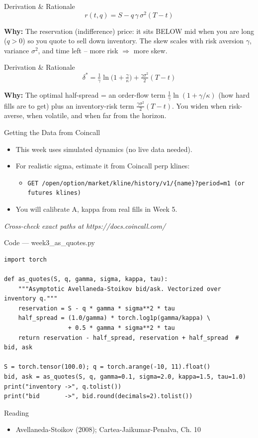 \documentclass[aspectratio=169,10pt]{beamer}
\begin{document}
\begin{frame}{Derivation \& Rationale}
\[r(t,q) = S - q\,\gamma\,\sigma^2 (T-t)\]

\small\textbf{\color{ncsured}Why:} The reservation (indifference) price: it sits BELOW mid when you are long ($q>0$) so you quote to sell down inventory. The skew scales with risk aversion $\gamma$, variance $\sigma^2$, and time left -- more risk $\Rightarrow$ more skew.
\end{frame}

\begin{frame}{Derivation \& Rationale}
\[\delta^* = \tfrac{1}{\gamma}\ln\!\big(1+\tfrac{\gamma}{\kappa}\big) + \tfrac{\gamma\sigma^2}{2}(T-t)\]

\small\textbf{\color{ncsured}Why:} The optimal half-spread = an order-flow term $\tfrac1\gamma\ln(1+\gamma/\kappa)$ (how hard fills are to get) plus an inventory-risk term $\tfrac{\gamma\sigma^2}{2}(T-t)$. You widen when risk-averse, when volatile, and when far from the horizon.
\end{frame}

\begin{frame}{Getting the Data from Coincall}
\begin{itemize}
  \item This week uses simulated dynamics (no live data needed).
  \item For realistic sigma, estimate it from Coincall perp klines:
  \begin{itemize}\item \texttt{\small GET /open/option/market/kline/history/v1/\{name\}?period=m1  (or futures klines)}\end{itemize}
  \item You will calibrate A, kappa from real fills in Week 5.
\end{itemize}
\vspace{2pt}\tiny\textit{Cross-check exact paths at https://docs.coincall.com/}
\end{frame}

\begin{frame}[fragile]{Code --- week3\_as\_quotes.py}
\begin{lstlisting}
import torch

def as_quotes(S, q, gamma, sigma, kappa, tau):
    """Asymptotic Avellaneda-Stoikov bid/ask. Vectorized over inventory q."""
    reservation = S - q * gamma * sigma**2 * tau
    half_spread = (1.0/gamma) * torch.log1p(gamma/kappa) \
                  + 0.5 * gamma * sigma**2 * tau
    return reservation - half_spread, reservation + half_spread  # bid, ask

S = torch.tensor(100.0); q = torch.arange(-10, 11).float()
bid, ask = as_quotes(S, q, gamma=0.1, sigma=2.0, kappa=1.5, tau=1.0)
print("inventory ->", q.tolist())
print("bid       ->", bid.round(decimals=2).tolist())
\end{lstlisting}
\end{frame}
\begin{frame}{Reading}
\begin{itemize}
  \item Avellaneda-Stoikov (2008); Cartea-Jaikumar-Penalva, Ch. 10
\end{itemize}
\end{frame}
\end{document}
